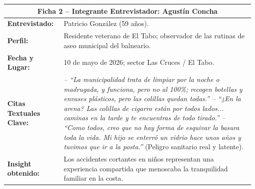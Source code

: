 \documentclass[12pt,letterpaper]{article}
\begin{document}
\begin{table}[h!]
\centering
\small
{}
\begin{tabularx}{\textwidth}{p{3.2cm}X}
\toprule
\multicolumn{2}{c}{\textbf{Ficha 2 -- Integrante Entrevistador: Agustín Concha}} \\
\midrule
\textbf{Entrevistado:} & Patricio González (59 años). \\
\textbf{Perfil:} & Residente veterano de El Tabo; observador de las rutinas de aseo municipal del balneario. \\
\textbf{Fecha y Lugar:} & 10 de mayo de 2026; sector Las Cruces / El Tabo. \\
\textbf{Citas Textuales Clave:} & 
\textit{-- ``La municipalidad trata de limpiar por la noche o madrugada, y funciona, pero no al 100\%; recogen botellas y envases plásticos, pero las colillas quedan todas.''} \newline
\textit{-- ``¿En la arena? Las colillas de cigarro están por todos lados... caminas en la tarde y te encuentras de todo tirado.''} \newline
\textit{-- ``Como todos, creo que no hay forma de esquivar la basura toda la vida. Mi hijo se enterró un vidrio hace unos años y tuvimos que ir a la posta.''} (Peligro sanitario real y latente). \\
\textbf{Insight obtenido:} & Los accidentes cortantes en niños representan una experiencia compartida que menoscaba la tranquilidad familiar en la costa. \\
\bottomrule
\end{tabularx}
\end{table}

\clearpage
\end{document}
